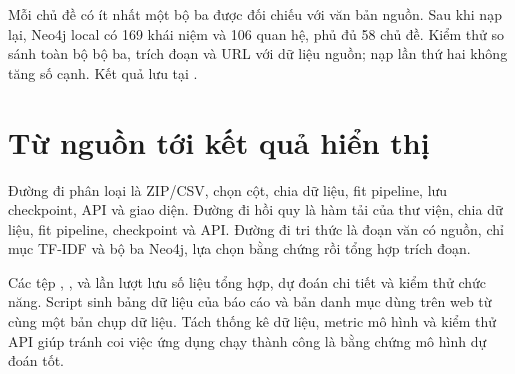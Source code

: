 Mỗi chủ đề có ít nhất một bộ ba được đối chiếu với văn bản nguồn. Sau khi nạp lại, Neo4j local có 169 khái niệm và 106 quan hệ, phủ đủ 58 chủ đề. Kiểm thử so sánh toàn bộ bộ ba, trích đoạn và URL với dữ liệu nguồn; nạp lần thứ hai không tăng số cạnh. Kết quả lưu tại .
\section{Từ nguồn tới kết quả hiển thị}
Đường đi phân loại là ZIP/CSV, chọn cột, chia dữ liệu, fit pipeline, lưu checkpoint, API và giao diện. Đường đi hồi quy là hàm tải của thư viện, chia dữ liệu, fit pipeline, checkpoint và API. Đường đi tri thức là đoạn văn có nguồn, chỉ mục TF-IDF và bộ ba Neo4j, lựa chọn bằng chứng rồi tổng hợp trích đoạn.

Các tệp , ,  và  lần lượt lưu số liệu tổng hợp, dự đoán chi tiết và kiểm thử chức năng. Script  sinh bảng dữ liệu của báo cáo và bản danh mục dùng trên web từ cùng một bản chụp dữ liệu. Tách thống kê dữ liệu, metric mô hình và kiểm thử API giúp tránh coi việc ứng dụng chạy thành công là bằng chứng mô hình dự đoán tốt.
